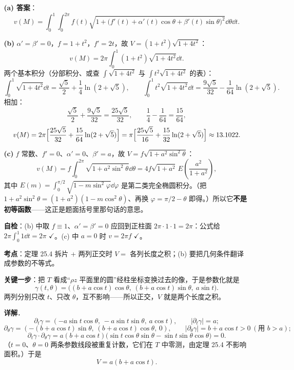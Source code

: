 \documentclass[11pt]{ctexart}
\renewcommand{\qbreak}{\needspace{0.22\textheight}}
\newcommand{\Vvol}{V}
\begin{document}
\textbf{(a) 答案}：
\[ v(M)=\int_0^1\!\!\int_0^{2\pi}f(t)\sqrt{1+\bigl(f'(t)+\alpha'(t)\cos\theta+\beta'(t)\sin\theta\bigr)^2}\dd\theta\dd t. \]

\textbf{(b)} $\alpha'=\beta'=0$，$f=1+t^2$，$f'=2t$，故 $\Vvol=(1+t^2)\sqrt{1+4t^2}$：
\[ v(M)=2\pi\int_0^1(1+t^2)\sqrt{1+4t^2}\dd t. \]
两个基本积分（分部积分、或查 $\int\sqrt{1+4t^2}$ 与 $\int t^2\sqrt{1+4t^2}$ 的表）：
\[ \int_0^1\sqrt{1+4t^2}\dd t=\frac{\sqrt5}{2}+\frac14\ln(2+\sqrt5),\qquad
   \int_0^1t^2\sqrt{1+4t^2}\dd t=\frac{9\sqrt5}{32}-\frac1{64}\ln(2+\sqrt5). \]
相加：
\[ \frac{\sqrt5}{2}+\frac{9\sqrt5}{32}=\frac{25\sqrt5}{32},\qquad \frac14-\frac1{64}=\frac{15}{64}, \]
\[ v(M)=2\pi\Bigl[\frac{25\sqrt5}{32}+\frac{15}{64}\ln(2+\sqrt5)\Bigr]=\pi\Bigl[\frac{25\sqrt5}{16}+\frac{15}{32}\ln(2+\sqrt5)\Bigr]\approx13.1022. \]

\textbf{(c)} $f$ 常数、$f'=0$、$\alpha'=0$、$\beta'=a$，故 $\Vvol=f\sqrt{1+a^2\sin^2\theta}$：
\[ v(M)=f\int_0^{2\pi}\sqrt{1+a^2\sin^2\theta}\dd\theta=4f\sqrt{1+a^2}\,E\!\left(\frac{a^2}{1+a^2}\right), \]
其中 $E(m)=\int_0^{\pi/2}\sqrt{1-m\sin^2\varphi}\dd\varphi$ 是第二类完全椭圆积分。（把 $1+a^2\sin^2\theta=(1+a^2)(1-m\cos^2\theta)$、再换 $\varphi=\pi/2-\theta$ 即得。）所以它\textbf{不是初等函数}——这正是题面括号里那句话的意思。

\textbf{自检}：(b) 中取 $f\equiv1$、$\alpha'=\beta'=0$ 应回到正柱面 $2\pi\cdot1\cdot1=2\pi$：公式给 $2\pi\int_0^1 1\dd t=2\pi$ $\checkmark$。(c) 中 $a=0$ 时 $v=2\pi f$ $\checkmark$。

\qbreak
{}\label{ax9}

\textbf{考点}：定理 25.4 拆片 + 两列正交时 $\Vvol=$ 各列长度之积；(b) 要把几何条件翻译成参数的不等式。

\textbf{关键一步}：把 $T$ 看成“$\rho z$ 平面里的圆”经柱坐标变换过去的像，于是参数化就是
\[ \gamma(t,\theta)=\bigl((b+a\cos t)\cos\theta,\ (b+a\cos t)\sin\theta,\ a\sin t\bigr). \]
两列分别只改 $t$、只改 $\theta$，互不影响——所以正交，$\Vvol$ 就是两个长度之积。

\textbf{详解}．
\[ \partial_t\gamma=(-a\sin t\cos\theta,\ -a\sin t\sin\theta,\ a\cos t),\qquad |\partial_t\gamma|=a; \]
\[ \partial_\theta\gamma=(-(b+a\cos t)\sin\theta,\ (b+a\cos t)\cos\theta,\ 0),\qquad |\partial_\theta\gamma|=b+a\cos t>0\ (\text{用 }b>a); \]
\[ \partial_t\gamma\!\cdot\!\partial_\theta\gamma=a(b+a\cos t)\bigl(\sin t\cos\theta\sin\theta-\sin t\sin\theta\cos\theta\bigr)=0. \]
（$t=0$、$\theta=0$ 两条参数线段被重复计数，它们在 $T$ 中零测，由定理 25.4 不影响面积。）于是
\[ \Vvol=a(b+a\cos t). \]
\end{document}

